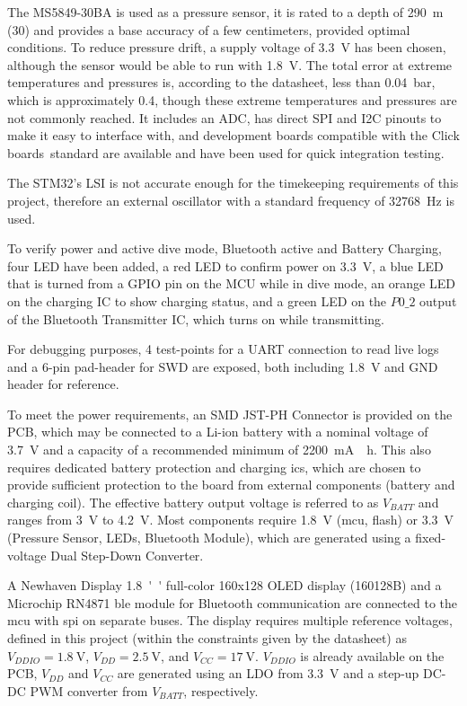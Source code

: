 The MS5849-30BA is used as a pressure sensor, it is rated to a depth of \SI{290}{\m} (\SI{30}{\Bar}) and provides a base accuracy of a few centimeters, provided optimal conditions. 
To reduce pressure drift, a supply voltage of \SI{3.3}{\volt} has been chosen, although the sensor would be able to run with \SI{1.8}{\volt}. 
The total error at extreme temperatures and pressures is, according to the datasheet, less than \SI{0.04}{\bar}, which is approximately \SI{0.4}{}, though these extreme temperatures and pressures are not commonly reached.
It includes an ADC, has direct SPI and I2C pinouts to make it easy to interface with, and development boards compatible with the Click boards\texttrademark\ standard are available and have been used for quick integration testing. 

The STM32's LSI is not accurate enough for the timekeeping requirements of this project, therefore an external oscillator with a standard frequency of \SI{32768}{\Hz} is used.

To verify power and active dive mode, Bluetooth active and Battery Charging, four LED have been added, a red LED to confirm power on \SI{3.3}{V}, a blue LED that is turned from a GPIO pin on the MCU while in dive mode, an orange LED on the charging IC to show charging status, and a green LED on the $P0\_2$ output of the Bluetooth Transmitter IC, which turns on while transmitting.

For debugging purposes, 4 test-points for a UART connection to read live logs and a 6-pin pad-header for SWD are exposed, both including \SI{1.8}{\volt} and GND header for reference.

To meet the power requirements, an SMD JST-PH Connector is provided on the PCB, which may be connected to a Li-ion battery with a nominal voltage of \SI{3.7}{\volt} and a capacity of a recommended minimum of \SI{2200}{\milli\ampere{}\hour}.
This also requires dedicated battery protection and charging \gls{ic}s, which are chosen to provide sufficient protection to the board from external components (battery and charging coil).
The effective battery output voltage is referred to as $V_{BATT}$ and ranges from \SI{3}{\volt} to \SI{4.2}{\volt}.
Most components require \SI{1.8}{\volt} (\gls{mcu}, flash) or \SI{3.3}{\volt} (Pressure Sensor, LEDs, Bluetooth Module), which are generated using a fixed-voltage Dual Step-Down Converter.

A Newhaven Display \SI{1.8}{''} full-color 160x128 OLED display (160128B) and a Microchip RN4871 \gls{ble} module for Bluetooth communication are connected to the \gls{mcu} with \gls{spi} on separate buses. 
The display requires multiple reference voltages, defined in this project (within the constraints given by the datasheet) as $V_{DDIO} = \SI{1.8}{\volt}$, $V_{DD} = \SI{2.5}{\volt}$, and $V_{CC} = \SI{17}{\volt}$. $V_{DDIO}$ is already available on the PCB, $V_{DD}$ and $V_{CC}$ are generated using an LDO from \SI{3.3}{\volt} and a step-up DC-DC PWM converter from $V_{BATT}$, respectively.

